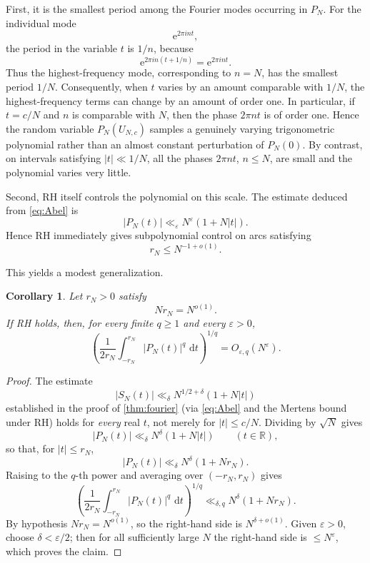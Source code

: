 \documentclass[11pt]{article}
\newtheorem{corollary}[theorem]{Corollary}
\theoremstyle{remark}
\newcommand{\e}{\mathrm e}
\newcommand{\dd}{\,\mathrm d}
\begin{document}
First, it is the smallest period among the Fourier modes occurring in \(P_N\).
For the individual mode
\[
  \e^{2\pi i n t},
\]
the period in the variable \(t\) is \(1/n\), because
\[
  \e^{2\pi i n(t+1/n)}=\e^{2\pi i nt}.
\]
Thus the highest-frequency mode, corresponding to \(n=N\), has the
smallest period \(1/N\).  Consequently, when \(t\) varies by an amount
comparable with \(1/N\), the highest-frequency terms can change by an
amount of order one.  In particular, if \(t=c/N\) and \(n\) is comparable
with \(N\), then the phase \(2\pi nt\) is of order one.  Hence the random
variable \(P_N(U_{N,c})\) samples a genuinely varying trigonometric
polynomial rather than an almost constant perturbation of \(P_N(0)\).
By contrast, on intervals satisfying \(|t|\ll 1/N\), all the phases
\(2\pi nt\), \(n\leq N\), are small and the polynomial varies very little.

Second, RH itself controls the polynomial on this scale.  The estimate
deduced from \eqref{eq:Abel} is
\[
 |P_N(t)|\ll_\varepsilon N^\varepsilon(1+N|t|).
\]
Hence RH immediately gives subpolynomial control on arcs satisfying
\[
 r_N\leq N^{-1+o(1)}.
\]

This yields a modest generalization.

\begin{corollary}\label{cor:variable-scale}
Let \(r_N>0\) satisfy
\[
 Nr_N=N^{o(1)}.
\]
If RH holds, then, for every finite \(q\geq1\) and every
\(\varepsilon>0\),
\[
 \left(
 \frac1{2r_N}\int_{-r_N}^{r_N}|P_N(t)|^q\,\dd t
 \right)^{1/q}
 =O_{\varepsilon,q}(N^\varepsilon).
\]
\end{corollary}

\begin{proof}
The estimate
\[
 |S_N(t)|\ll_\delta N^{1/2+\delta}(1+N|t|)
\]
established in the proof of \cref{thm:fourier} (via \eqref{eq:Abel}
and the Mertens bound under RH) holds for \emph{every} real \(t\), not
merely for \(|t|\leq c/N\).  Dividing by \(\sqrt N\) gives
\[
 |P_N(t)|\ll_\delta N^\delta(1+N|t|)
 \qquad(t\in\mathbb R),
\]
so that, for \(|t|\leq r_N\),
\[
 |P_N(t)|\ll_\delta N^\delta(1+Nr_N).
\]
Raising to the \(q\)-th power and averaging over \((-r_N,r_N)\) gives
\[
 \left(
 \frac1{2r_N}\int_{-r_N}^{r_N}|P_N(t)|^q\,\dd t
 \right)^{1/q}
 \ll_{\delta,q}
 N^\delta(1+Nr_N).
\]
By hypothesis \(Nr_N=N^{o(1)}\), so the right-hand side is
\(N^{\delta+o(1)}\).  Given \(\varepsilon>0\), choose
\(\delta<\varepsilon/2\); then for all sufficiently large \(N\) the
right-hand side is \(\leq N^{\varepsilon}\), which proves the claim.
\end{proof}
\end{document}
